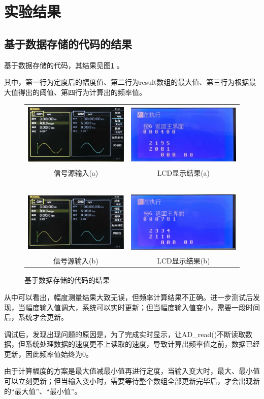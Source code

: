 \documentclass[12pt]{article}
\begin{document}
\section{实验结果}
\setcounter{table}{0}\setcounter{figure}{0}\setcounter{equation}{0}
\subsection{基于数据存储的代码的结果}\label{jysjccdjg}
基于数据存储的代码，其结果见图\ref{sjccjg}
。\par 其中，第一行为定度后的幅度值、第二行为result数组的最大值、第三行为根据最大值得出的阈值、第四行为计算出的频率值。
\begin{figure}[htbp]
  \centering
  \begin{tabular}{cc}
  \includegraphics[height=3cm]{18}&\includegraphics[height=3cm]{17}\\
  信号源输入(a)&LCD显示结果(a)\\
  \ &\ \\
    \includegraphics[height=3cm]{19}&\includegraphics[height=3cm]{14}\\
  信号源输入(b)&LCD显示结果(b)\\
  \end{tabular}
  \caption{基于数据存储的代码的结果}\label{sjccjg}
\end{figure}\par
从中可以看出，幅度测量结果大致无误，但频率计算结果不正确。进一步测试后发现，当幅度输入值调大，系统可以实时更新；但当幅度输入值变小，需要一段时间后，系统才会更新。\par
调试后，发现出现问题的原因是，为了完成实时显示，让AD\_read()不断读取数据，但系统处理数据的速度更不上读取的速度，导致计算出频率值之前，数据已经更新，因此频率值始终为0。\par
由于计算幅度的方案是最大值减最小值再进行定度，当输入变大时，最大、最小值可以立刻更新；但当输入变小时，需要等待整个数组全部更新完毕后，才会出现新的“最大值”、“最小值”。
\end{document}
